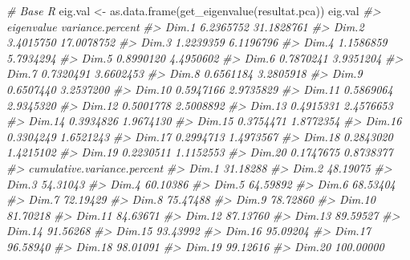\documentclass[
]{article}
\newenvironment{Shaded}{\begin{snugshade}}{\end{snugshade}}
\newcommand{\CommentTok}[1]{\textcolor[rgb]{0.56,0.35,0.01}{\textit{#1}}}
\newcommand{\FunctionTok}[1]{\textcolor[rgb]{0.00,0.00,0.00}{#1}}
\newcommand{\NormalTok}[1]{#1}
\newcommand{\OtherTok}[1]{\textcolor[rgb]{0.56,0.35,0.01}{#1}}
\begin{document}
\begin{Shaded}
\begin{Highlighting}[]
\CommentTok{\# Base R}
\NormalTok{eig.val }\OtherTok{\textless{}{-}} \FunctionTok{as.data.frame}\NormalTok{(}\FunctionTok{get\_eigenvalue}\NormalTok{(resultat.pca))}
\NormalTok{eig.val}
\CommentTok{\#\textgreater{}        eigenvalue variance.percent}
\CommentTok{\#\textgreater{} Dim.1   6.2365752       31.1828761}
\CommentTok{\#\textgreater{} Dim.2   3.4015750       17.0078752}
\CommentTok{\#\textgreater{} Dim.3   1.2239359        6.1196796}
\CommentTok{\#\textgreater{} Dim.4   1.1586859        5.7934294}
\CommentTok{\#\textgreater{} Dim.5   0.8990120        4.4950602}
\CommentTok{\#\textgreater{} Dim.6   0.7870241        3.9351204}
\CommentTok{\#\textgreater{} Dim.7   0.7320491        3.6602453}
\CommentTok{\#\textgreater{} Dim.8   0.6561184        3.2805918}
\CommentTok{\#\textgreater{} Dim.9   0.6507440        3.2537200}
\CommentTok{\#\textgreater{} Dim.10  0.5947166        2.9735829}
\CommentTok{\#\textgreater{} Dim.11  0.5869064        2.9345320}
\CommentTok{\#\textgreater{} Dim.12  0.5001778        2.5008892}
\CommentTok{\#\textgreater{} Dim.13  0.4915331        2.4576653}
\CommentTok{\#\textgreater{} Dim.14  0.3934826        1.9674130}
\CommentTok{\#\textgreater{} Dim.15  0.3754471        1.8772354}
\CommentTok{\#\textgreater{} Dim.16  0.3304249        1.6521243}
\CommentTok{\#\textgreater{} Dim.17  0.2994713        1.4973567}
\CommentTok{\#\textgreater{} Dim.18  0.2843020        1.4215102}
\CommentTok{\#\textgreater{} Dim.19  0.2230511        1.1152553}
\CommentTok{\#\textgreater{} Dim.20  0.1747675        0.8738377}
\CommentTok{\#\textgreater{}        cumulative.variance.percent}
\CommentTok{\#\textgreater{} Dim.1                     31.18288}
\CommentTok{\#\textgreater{} Dim.2                     48.19075}
\CommentTok{\#\textgreater{} Dim.3                     54.31043}
\CommentTok{\#\textgreater{} Dim.4                     60.10386}
\CommentTok{\#\textgreater{} Dim.5                     64.59892}
\CommentTok{\#\textgreater{} Dim.6                     68.53404}
\CommentTok{\#\textgreater{} Dim.7                     72.19429}
\CommentTok{\#\textgreater{} Dim.8                     75.47488}
\CommentTok{\#\textgreater{} Dim.9                     78.72860}
\CommentTok{\#\textgreater{} Dim.10                    81.70218}
\CommentTok{\#\textgreater{} Dim.11                    84.63671}
\CommentTok{\#\textgreater{} Dim.12                    87.13760}
\CommentTok{\#\textgreater{} Dim.13                    89.59527}
\CommentTok{\#\textgreater{} Dim.14                    91.56268}
\CommentTok{\#\textgreater{} Dim.15                    93.43992}
\CommentTok{\#\textgreater{} Dim.16                    95.09204}
\CommentTok{\#\textgreater{} Dim.17                    96.58940}
\CommentTok{\#\textgreater{} Dim.18                    98.01091}
\CommentTok{\#\textgreater{} Dim.19                    99.12616}
\CommentTok{\#\textgreater{} Dim.20                   100.00000}
\end{Highlighting}
\end{Shaded}
\end{document}
